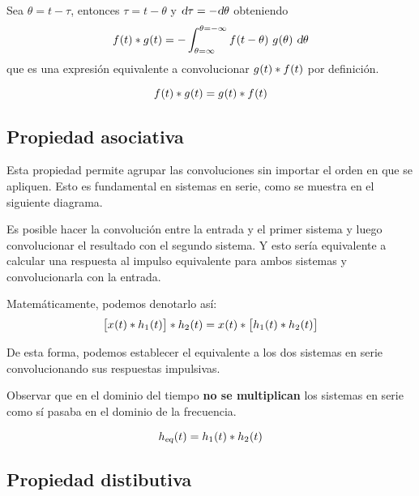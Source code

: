 Sea $\theta = t - \tau$, entonces $\tau = t - \theta$ y $\dif \tau = - \dif \theta$ obteniendo
\[
    \fx{t} * \fx[g]{t}
    = - \int_{\theta = \infty}^{\theta = -\infty} \fx[f]{t - \theta} \, \fx[g]{\theta} \, \dif \theta
\]
que es una expresión equivalente a convolucionar $\fx[g]{t} * \fx{t}$ por definición.

\begin{mdframed}[style=PropertyFrame]
    \begin{prop}
    \end{prop}
    \[
        \fx{t} * \fx[g]{t} = \fx[g]{t} * \fx{t}
    \]
\end{mdframed}

\subsection{Propiedad asociativa}

Esta propiedad permite agrupar las convoluciones sin importar el orden en que se apliquen.
Esto es fundamental en sistemas en serie, como se muestra en el siguiente diagrama.

\begin{center}
    \def\svgwidth{0.8\linewidth}
    
\end{center}

Es posible hacer la convolución entre la entrada y el primer sistema y luego convolucionar el resultado con el segundo sistema.
Y esto sería equivalente a calcular una respuesta al impulso equivalente para ambos sistemas y convolucionarla con la entrada.

Matemáticamente, podemos denotarlo así:
\[
    \inBrackets{\fx[x]{t} * \fx[h_1]{t}} * \fx[h_2]{t}
    = \fx[x]{t} * \inBrackets{\fx[h_1]{t} * \fx[h_2]{t}}
\]

De esta forma, podemos establecer el equivalente a los dos sistemas en serie convolucionando sus respuestas impulsivas.

Observar que en el dominio del tiempo \textbf{no se multiplican} los sistemas en serie como sí pasaba en el dominio de la frecuencia.

\begin{mdframed}[style=PropertyFrame]
    \begin{prop}
    \end{prop}
    \[
        \fx[\sub{h}{eq}]{t} = \fx[h_1]{t} * \fx[h_2]{t}
    \]
\end{mdframed}

\subsection{Propiedad distibutiva}

